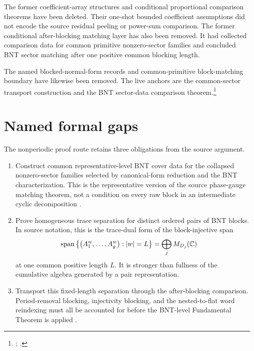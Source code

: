 \documentclass{article}
\begin{document}
The former coefficient-array structures and conditional proportional comparison
theorems have been deleted. Their one-shot bounded coefficient assumptions did
not encode the source residual peeling or power-sum comparison. The former
conditional after-blocking matching layer has also been removed. It had
collected comparison data for common primitive nonzero-sector families and
concluded BNT sector matching after one positive common blocking length.

The named blocked-normal-form records and common-primitive block-matching
boundary have likewise been removed. The live anchors are the common-sector
transport construction and the BNT sector-data comparison theorem.\footnote{%
;
.}

\section{Named formal gaps}

The nonperiodic proof route retains three obligations from the source argument.

\begin{enumerate}
    \item Construct common representative-level BNT cover data for the
    collapsed nonzero-sector families selected by canonical-form reduction and
    the BNT characterization. This is the representative version of the source
    phase-gauge matching theorem, not a condition on every raw block in an
    intermediate cyclic decomposition
    \cite{Cirac2016MPDO_arXiv,Cirac2021Matrix}.

    \item Prove homogeneous trace separation for distinct ordered pairs of BNT
    blocks. In source notation, this is the trace-dual form of the
    block-injective span
    \begin{align}
        \operatorname{span}
            \left\{\left(A_1^w,\ldots,A_g^w\right): |w|=L\right\}
            &=
            \bigoplus_j M_{D_j}(\mathbb{C})
    \label{eq:rmp_nonperiodic_bnt_comparison_inputs_named_gap_direct_sum}
    \end{align}
    at one common positive length $L$. It is stronger than fullness of the
    cumulative algebra generated by a pair representation.

    \item Transport this fixed-length separation through the after-blocking
    comparison. Period-removal blocking, injectivity blocking, and the
    nested-to-flat word reindexing must all be accounted for before the
    BNT-level Fundamental Theorem is applied
    \cite{Cirac2016MPDO_arXiv,Cirac2021Matrix}.
\end{enumerate}
\end{document}
